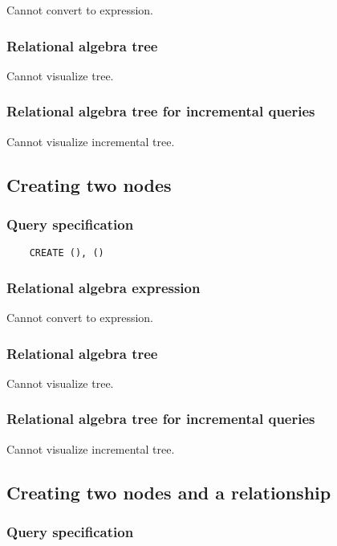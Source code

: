 	Cannot convert to expression.

	\subsubsection*{Relational algebra tree}

	Cannot visualize tree.

	\subsubsection*{Relational algebra tree for incremental queries}

	Cannot visualize incremental tree.
	\subsection{Creating two nodes}

	\subsubsection*{Query specification}

	\begin{lstlisting}
	CREATE (), ()
	\end{lstlisting}


	\subsubsection*{Relational algebra expression}

	Cannot convert to expression.

	\subsubsection*{Relational algebra tree}

	Cannot visualize tree.

	\subsubsection*{Relational algebra tree for incremental queries}

	Cannot visualize incremental tree.
	\subsection{Creating two nodes and a relationship}

	\subsubsection*{Query specification}

